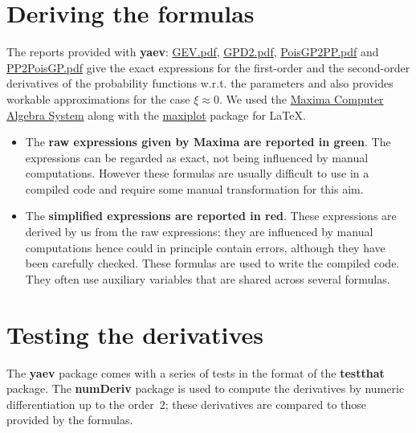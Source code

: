 \documentclass[11pt]{article}\usepackage[]{graphicx}\usepackage[]{xcolor}
\begin{document}
\section{Deriving the formulas}

The reports provided with \textbf{yaev}: 
\href{https://github.com/yvesdeville/yaev/blob/main/inst/doc/GEV.pdf}{GEV.pdf},
\href{https://github.com/yvesdeville/yaev/blob/main/inst/doc/GPD2.pdf}{GPD2.pdf},
\href{https://github.com/yvesdeville/yaev/blob/main/inst/doc/PoisGP2PP.pdf}{PoisGP2PP.pdf} and
\href{https://github.com/yvesdeville/yaev/blob/main/inst/doc/PP2PoisGP.pdf}{PP2PoisGP.pdf}
  give the exact expressions for
the first-order and the second-order derivatives of the probability
functions w.r.t. the parameters and also provides workable
approximations for the case $\xi \approx 0$. We used the
\href{https://maxima.sourceforge.io/}{Maxima Computer Algebra System}
along with the
\href{https://maxima.sourceforge.io/contrib/maxiplot/maxiplot.sty}{maxiplot}
package for \LaTeX{}.

\begin{itemize}
\item The {\color{MonVertF} \bf raw expressions given by Maxima are
    reported in green}. The expressions can be regarded as exact, not
  being influenced by manual computations. However these formulas are
  usually difficult to use in a compiled code and require some manual
  transformation for this aim.

\item The {\color{red} \bf simplified expressions are reported in
    red}.  These expressions are derived by us from the raw
  expressions; they are influenced by manual computations hence could
  in principle contain errors, although they have been carefully
  checked. These formulas are used to write the compiled code.  They
  often use auxiliary variables that are shared across several
  formulas.
  
\end{itemize}

\section{Testing the derivatives}

The \textbf{yaev} package comes with a series of tests in the format
of the \textbf{testthat} package. The \textbf{numDeriv} package is
used to compute the derivatives by numeric differentiation up to the
order~2; these derivatives are compared to those provided by the
formulas.
\end{document}
